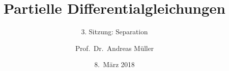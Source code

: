 \documentclass[handout]{beamer}
\title[]{Partielle Differentialgleichungen}
\subtitle{3. Sitzung: Separation}
\date[8.~März 2018]{8.~März 2018}
\author{Prof.~Dr.~Andreas Müller}
\begin{document}
\begin{frame}
\titlepage

\end{frame}


\end{document}
